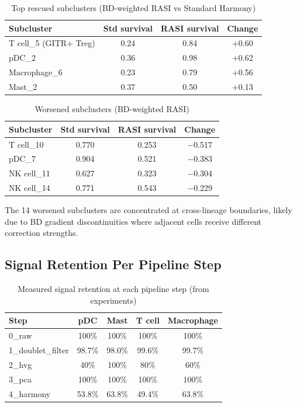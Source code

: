 \documentclass[10pt]{article}
\begin{document}
\begin{table}[H]
\centering
\caption{Top rescued subclusters (BD-weighted RASI vs Standard Harmony)}
\begin{tabular}{lccc}
\toprule
Subcluster & Std survival & RASI survival & Change \\
\midrule
T cell\_5 (GITR+ Treg) & 0.24 & 0.84 & +0.60 \\
pDC\_2 & 0.36 & 0.98 & +0.62 \\
Macrophage\_6 & 0.23 & 0.79 & +0.56 \\
Mast\_2 & 0.37 & 0.50 & +0.13 \\
\bottomrule
\end{tabular}
\end{table}

\begin{table}[H]
\centering
\caption{Worsened subclusters (BD-weighted RASI)}
\begin{tabular}{lccc}
\toprule
Subcluster & Std survival & RASI survival & Change \\
\midrule
T cell\_10 & 0.770 & 0.253 & $-$0.517 \\
pDC\_7 & 0.904 & 0.521 & $-$0.383 \\
NK cell\_11 & 0.627 & 0.323 & $-$0.304 \\
NK cell\_14 & 0.771 & 0.543 & $-$0.229 \\
\bottomrule
\end{tabular}
\end{table}

The 14 worsened subclusters are concentrated at cross-lineage boundaries, likely due to BD gradient discontinuities where adjacent cells receive different correction strengths.

\subsection{Signal Retention Per Pipeline Step}

\begin{table}[H]
\centering
\caption{Measured signal retention at each pipeline step (from experiments)}
\begin{tabular}{lcccc}
\toprule
Step & pDC & Mast & T cell & Macrophage \\
\midrule
0\_raw & 100\% & 100\% & 100\% & 100\% \\
1\_doublet\_filter & 98.7\% & 98.0\% & 99.6\% & 99.7\% \\
2\_hvg & 40\% & 100\% & 80\% & 60\% \\
3\_pca & 100\% & 100\% & 100\% & 100\% \\
4\_harmony & 53.8\% & 63.8\% & 49.4\% & 63.8\% \\
\bottomrule
\end{tabular}
\end{table}
\end{document}
